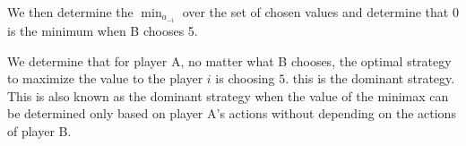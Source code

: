  We then determine the $\min_{a_{-i}}$ over the set of chosen values and determine that $0$ is the minimum when B chooses 5.

 We determine that for player A, no matter what B chooses, the optimal strategy to maximize the value to the player $i$ is choosing $5$. this is the dominant strategy. This is also known as the dominant strategy when the value of the minimax can be determined only based on player A's actions without depending on the actions of player B. 
 

 








